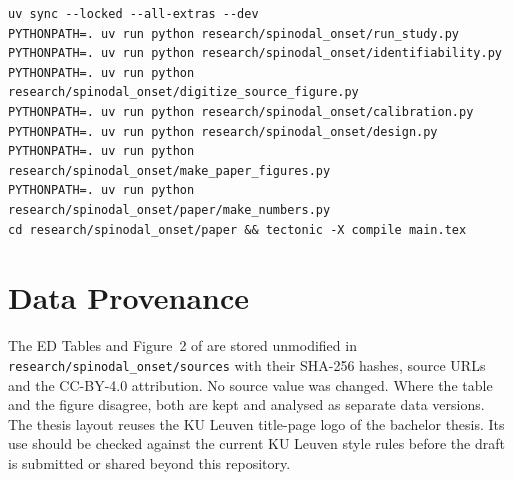 \begin{verbatim}
uv sync --locked --all-extras --dev
PYTHONPATH=. uv run python research/spinodal_onset/run_study.py
PYTHONPATH=. uv run python research/spinodal_onset/identifiability.py
PYTHONPATH=. uv run python research/spinodal_onset/digitize_source_figure.py
PYTHONPATH=. uv run python research/spinodal_onset/calibration.py
PYTHONPATH=. uv run python research/spinodal_onset/design.py
PYTHONPATH=. uv run python research/spinodal_onset/make_paper_figures.py
PYTHONPATH=. uv run python research/spinodal_onset/paper/make_numbers.py
cd research/spinodal_onset/paper && tectonic -X compile main.tex
\end{verbatim}

\section{Data Provenance}

The ED Tables and Figure~2 of \cite{gilmore2026} are stored unmodified in
\texttt{research/spinodal\_onset/sources} with their SHA-256 hashes, source URLs and the
CC-BY-4.0 attribution. No source value was changed. Where the table and the figure disagree,
both are kept and analysed as separate data versions. The thesis layout reuses the KU Leuven
title-page logo of the bachelor thesis. Its use should be checked against the current KU Leuven
style rules before the draft is submitted or shared beyond this repository.
